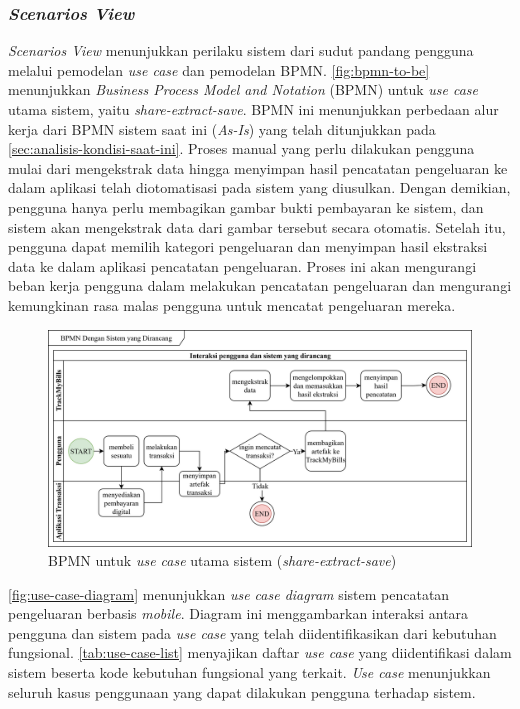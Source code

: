 \subsubsection{\emph{Scenarios View}}
\label{subsubsec:use-case-view}

\emph{Scenarios View} menunjukkan perilaku sistem dari sudut pandang pengguna melalui pemodelan \emph{use case} dan pemodelan BPMN. \autoref{fig:bpmn-to-be} menunjukkan \emph{Business Process Model and Notation} (BPMN) untuk \emph{use case} utama sistem, yaitu \emph{share-extract-save}. BPMN ini menunjukkan perbedaan alur kerja dari BPMN sistem saat ini (\emph{As-Is}) yang telah ditunjukkan pada \autoref{sec:analisis-kondisi-saat-ini}. Proses manual yang perlu dilakukan pengguna mulai dari mengekstrak data hingga menyimpan hasil pencatatan pengeluaran ke dalam aplikasi telah diotomatisasi pada sistem yang diusulkan. Dengan demikian, pengguna hanya perlu membagikan gambar bukti pembayaran ke sistem, dan sistem akan mengekstrak data dari gambar tersebut secara otomatis. Setelah itu, pengguna dapat memilih kategori pengeluaran dan menyimpan hasil ekstraksi data ke dalam aplikasi pencatatan pengeluaran. Proses ini akan mengurangi beban kerja pengguna dalam melakukan pencatatan pengeluaran dan mengurangi kemungkinan rasa malas pengguna untuk mencatat pengeluaran mereka.

\begin{figure}[htbp]
    \centering
    \includegraphics[width=1\textwidth]{images/To-be.png}
    \caption{BPMN untuk \emph{use case} utama sistem (\emph{share-extract-save})}
    \label{fig:bpmn-to-be}
\end{figure}

\autoref{fig:use-case-diagram} menunjukkan \emph{use case diagram} sistem pencatatan pengeluaran berbasis \emph{mobile}. Diagram ini menggambarkan interaksi antara pengguna dan sistem pada \emph{use case} yang telah diidentifikasikan dari kebutuhan fungsional. \autoref{tab:use-case-list} menyajikan daftar \emph{use case} yang diidentifikasi dalam sistem beserta kode kebutuhan fungsional yang terkait. \emph{Use case} menunjukkan seluruh kasus penggunaan yang dapat dilakukan pengguna terhadap sistem. 

